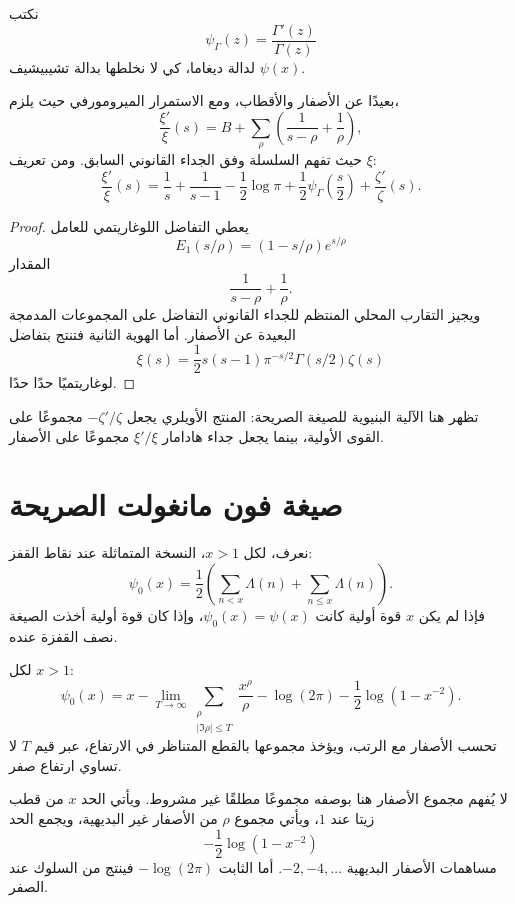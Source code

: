 نكتب
\[
\psi_\Gamma(z)=\frac{\Gamma'(z)}{\Gamma(z)}
\]
لدالة ديغاما، كي لا نخلطها بدالة تشيبيشيف \(\psi(x)\).

\begin{proposition}
\label{prop:xi-logarithmic-derivative}
\provedhere
بعيدًا عن الأصفار والأقطاب، ومع الاستمرار الميرومورفي حيث يلزم،
\[
\frac{\xi'}{\xi}(s)
=
B+\sum_\rho
\left(
\frac{1}{s-\rho}+\frac{1}{\rho}
\right),
\]
حيث تفهم السلسلة وفق الجداء القانوني السابق. ومن تعريف \(\xi\):
\[
\frac{\xi'}{\xi}(s)
=
\frac1s+\frac1{s-1}
-\frac12\log\pi
+\frac12\psi_\Gamma\!\left(\frac{s}{2}\right)
+\frac{\zeta'}{\zeta}(s).
\]
\end{proposition}

\begin{proof}
يعطي التفاضل اللوغاريتمي للعامل
\[
E_1(s/\rho)
=
(1-s/\rho)e^{s/\rho}
\]
المقدار
\[
\frac{1}{s-\rho}+\frac{1}{\rho}.
\]
ويجيز التقارب المحلي المنتظم للجداء القانوني التفاضل على المجموعات
المدمجة البعيدة عن الأصفار. أما الهوية الثانية فتنتج بتفاضل
\[
\xi(s)
=
\frac12s(s-1)\pi^{-s/2}\Gamma(s/2)\zeta(s)
\]
لوغاريتميًا حدًا حدًا.
\end{proof}

تظهر هنا الآلية البنيوية للصيغة الصريحة: المنتج الأويلري يجعل
\(-\zeta'/\zeta\) مجموعًا على القوى الأولية، بينما يجعل جداء هادامار
\(\xi'/\xi\) مجموعًا على الأصفار.

\section{صيغة فون مانغولت الصريحة}

نعرف، لكل \(x>1\)، النسخة المتماثلة عند نقاط القفز:
\[
\psi_0(x)
=
\frac12
\left(
\sum_{n<x}\Lambda(n)
+
\sum_{n\leq x}\Lambda(n)
\right).
\]
فإذا لم يكن \(x\) قوة أولية كانت \(\psi_0(x)=\psi(x)\)، وإذا كان قوة
أولية أخذت الصيغة نصف القفزة عنده.

\begin{theorem}
\label{thm:von-mangoldt-explicit-formula}
لكل \(x>1\):
\[
\psi_0(x)
=
x
-
\lim_{T\to\infty}
\sum_{\substack{\rho\\|\Im\rho|\leq T}}
\frac{x^\rho}{\rho}
-
\log(2\pi)
-
\frac12\log(1-x^{-2}).
\]
تحسب الأصفار مع الرتب، ويؤخذ مجموعها بالقطع المتناظر في الارتفاع،
عبر قيم \(T\) لا تساوي ارتفاع صفر.
\end{theorem}

لا يُفهم مجموع الأصفار هنا بوصفه مجموعًا مطلقًا غير مشروط. ويأتي الحد
\(x\) من قطب زيتا عند \(1\)، ويأتي مجموع \(\rho\) من الأصفار غير
البديهية، ويجمع الحد
\[
-\frac12\log(1-x^{-2})
\]
مساهمات الأصفار البديهية \(-2,-4,\ldots\). أما الثابت
\(-\log(2\pi)\) فينتج من السلوك عند الصفر.


